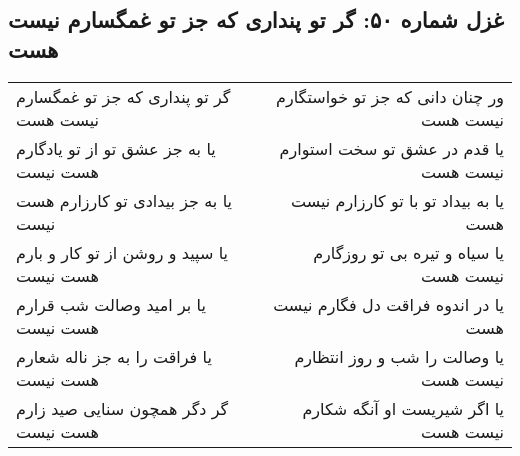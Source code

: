 \begin{center}
\section*{غزل شماره ۵۰: گر تو پنداری که جز تو غمگسارم نیست هست}
\label{sec:050}
\begin{longtable}{l p{0.5cm} r}
گر تو پنداری که جز تو غمگسارم نیست هست
&&
ور چنان دانی که جز تو خواستگارم نیست هست
\\
یا به جز عشق تو از تو یادگارم هست نیست
&&
یا قدم در عشق تو سخت استوارم نیست هست
\\
یا به جز بیدادی تو کارزارم هست نیست
&&
یا به بیداد تو با تو کارزارم نیست هست
\\
یا سپید و روشن از تو کار و بارم هست نیست
&&
یا سیاه و تیره بی تو روزگارم نیست هست
\\
یا بر امید وصالت شب قرارم هست نیست
&&
یا در اندوه فراقت دل فگارم نیست هست
\\
یا فراقت را به جز ناله شعارم هست نیست
&&
یا وصالت را شب و روز انتظارم نیست هست
\\
گر دگر همچون سنایی صید زارم هست نیست
&&
یا اگر شیریست او آنگه شکارم نیست هست
\\
\end{longtable}
\end{center}
